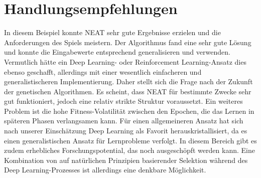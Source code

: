 \section{Handlungsempfehlungen}
In diesem Beispiel konnte NEAT sehr gute Ergebnisse erzielen und die Anforderungen des Spiels meistern. Der Algorithmus fand eine sehr gute Lösung und konnte die Eingabewerte entsprechend generalisieren und verwenden. Vermutlich hätte ein Deep Learning- oder Reinforcement Learning-Ansatz dies ebenso geschafft, allerdings mit einer wesentlich einfacheren und generalistischeren Implementierung. Daher stellt sich die Frage nach der Zukunft der genetischen Algorithmen. Es scheint, dass NEAT für bestimmte Zwecke sehr gut funktioniert, jedoch eine relativ strikte Struktur voraussetzt. Ein weiteres Problem ist die hohe Fitness-Volatilität zwischen den Epochen, die das Lernen in späteren Phasen verlangsamen kann. Für einen allgemeineren Ansatz hat sich nach unserer Einschätzung Deep Learning als Favorit herauskristallisiert, da es einen generalistischen Ansatz für Lernprobleme verfolgt. In diesem Bereich gibt es zudem erhebliches Forschungspotential, das noch ausgeschöpft werden kann. Eine Kombination von auf natürlichen Prinzipien basierender Selektion während des Deep Learning-Prozesses ist allerdings eine denkbare Möglichkeit.